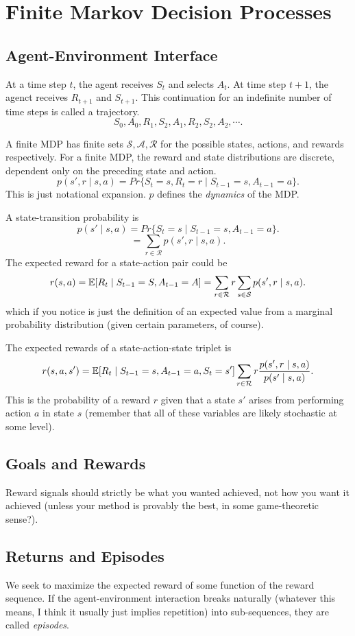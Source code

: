 \documentclass[a4paper]{report}
\begin{document}
\chapter{Finite Markov Decision Processes}

\section{Agent-Environment Interface}
At a time step $t$, the agent receives $S_t$ and selects  $A_t$. At time step  $t+1$, the agenct receives  $R_{t+1}$ and  $S_{t+1}$. This continuation for an indefinite number of time steps is called a trajectory.
 \[
S_0, A_0, R_1, S_2, A_1, R_2, S_2, A_2, \cdots
.\] 

A finite MDP has finite sets $\mathcal{S}, \mathcal{A}, \mathcal{R}$ for the possible states, actions, and rewards respectively. For a finite MDP, the reward and state distributions are discrete, dependent only on the preceding state and action.
\[
  p(s', r \mid s, a) = Pr\{S_t=s, R_t=r \mid S_{t-1}=s, A_{t-1}=a\}
.\] 
This is just notational expansion. $p$ defines the \textit{dynamics} of the MDP.

A state-transition probability is
\[
  p(s' \mid s, a) = Pr\{S_t=s \mid S_{t-1}=s, A_{t-1}=a\}
.\] 
\[
  = \sum_{r\in\mathcal{R}} p(s', r \mid s, a)
.\] 
The expected reward for a state-action pair could be
\[
r(s,a) = \mathbb{E}[R_t \mid S_{t-1}=S, A_{t-1}=A] \\
= \sum_{r\in\mathcal{R}}r\sum_{s\in\mathcal{S}}p(s',r \mid s,a)
.\]
which if you notice is just the definition of an expected value from a marginal probability distribution (given certain parameters, of course).

The expected rewards of a state-action-state triplet is
\[
  r(s,a,s') = \mathbb{E}[R_t \mid S_{t-1}=s, A_{t-1}=a, S_t=s'] \\
  \sum_{r\in\mathcal{R}} r\frac{p(s',r \mid s,a)}{p(s' \mid s,a)}
.\]
This is the probability of a reward $r$ given that a state $s'$ arises from performing action $a$ in state $s$ (remember that all of these variables are likely stochastic at some level).

\section{Goals and Rewards}
Reward signals should strictly be what you wanted achieved, not how you want it achieved (unless your method is provably the best, in some game-theoretic sense?).

\section{Returns and Episodes}
We seek to maximize the expected reward of some function of the reward sequence. If the agent-environment interaction breaks naturally (whatever this means, I think it usually just implies repetition) into sub-sequences, they are called \textit{episodes}.
\end{document}

